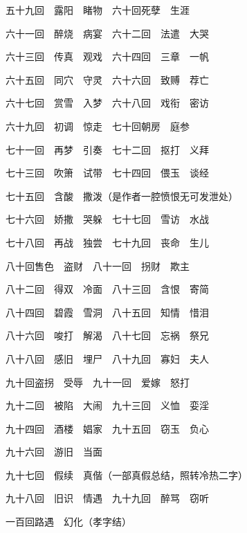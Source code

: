 \begin{showcontents}{}
{五十九回　露阳　睹物　六十回死孽　生涯

六十一回　醉烧　病宴　六十二回　法遣　大哭

六十三回　传真　观戏　六十四回　三章　一帆

六十五回　同穴　守灵　六十六回　致赙　荐亡

六十七回　赏雪　入梦　六十八回　戏衔　密访

六十九回　初调　惊走　七十回朝房　庭参

七十一回　再梦　引奏　七十二回　抠打　义拜

七十三回　吹箫　试带　七十四回　偎玉　谈经

七十五回　含酸　撒泼（是作者一腔愤恨无可发泄处）

七十六回　娇撒　哭躲　七十七回　雪访　水战

七十八回　再战　独尝　七十九回　丧命　生儿

八十回售色　盗财　八十一回　拐财　欺主

八十二回　得双　冷面　八十三回　含恨　寄简

八十四回　碧霞　雪洞　八十五回　知情　惜泪

八十六回　唆打　解渴　八十七回　忘祸　祭兄

八十八回　感旧　埋尸　八十九回　寡妇　夫人

九十回盗拐　受辱　九十一回　爱嫁　怒打

九十二回　被陷　大闹　九十三回　义恤　娈淫

九十四回　酒楼　娼家　九十五回　窃玉　负心

九十六回　游旧　当面

九十七回　假续　真偕（一部真假总结，照转冷热二字）

九十八回　旧识　情遇　九十九回　醉骂　窃听

一百回路遇　幻化（孝字结）

} %

\end{showcontents}
